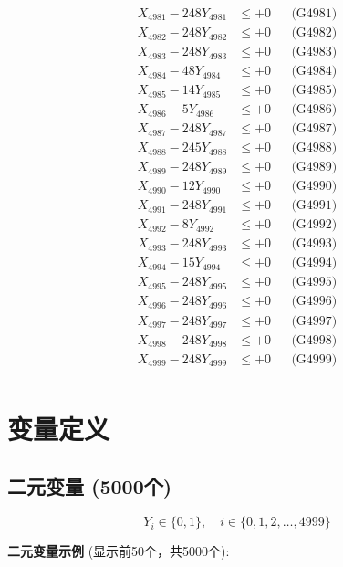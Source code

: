 \documentclass[a4paper,10pt]{article}
\begin{document}
{\begin{align}
\allowbreak
X_{4981} - 248Y_{4981} &\leq +0 && \text{(G4981)} \\
X_{4982} - 248Y_{4982} &\leq +0 && \text{(G4982)} \\
X_{4983} - 248Y_{4983} &\leq +0 && \text{(G4983)} \\
X_{4984} - 48Y_{4984} &\leq +0 && \text{(G4984)} \\
X_{4985} - 14Y_{4985} &\leq +0 && \text{(G4985)} \\
X_{4986} - 5Y_{4986} &\leq +0 && \text{(G4986)} \\
X_{4987} - 248Y_{4987} &\leq +0 && \text{(G4987)} \\
X_{4988} - 245Y_{4988} &\leq +0 && \text{(G4988)} \\
X_{4989} - 248Y_{4989} &\leq +0 && \text{(G4989)} \\
X_{4990} - 12Y_{4990} &\leq +0 && \text{(G4990)} \\
\allowbreak
X_{4991} - 248Y_{4991} &\leq +0 && \text{(G4991)} \\
X_{4992} - 8Y_{4992} &\leq +0 && \text{(G4992)} \\
X_{4993} - 248Y_{4993} &\leq +0 && \text{(G4993)} \\
X_{4994} - 15Y_{4994} &\leq +0 && \text{(G4994)} \\
X_{4995} - 248Y_{4995} &\leq +0 && \text{(G4995)} \\
X_{4996} - 248Y_{4996} &\leq +0 && \text{(G4996)} \\
X_{4997} - 248Y_{4997} &\leq +0 && \text{(G4997)} \\
X_{4998} - 248Y_{4998} &\leq +0 && \text{(G4998)} \\
X_{4999} - 248Y_{4999} &\leq +0 && \text{(G4999)} \\
\end{align}
}

\section{变量定义}

\subsection{二元变量 (5000个)}

\begin{equation}
Y_i \in \{0,1\}, \quad i \in \{0, 1, 2, \ldots, 4999\}
\end{equation}

\textbf{二元变量示例} (显示前50个，共5000个):
\end{document}
